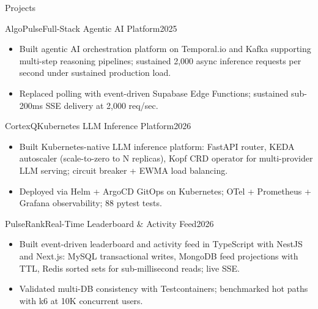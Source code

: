 \documentclass[]{mcdowellcv}
\begin{document}
\begin{cvsection}{Projects}
  \begin{cvsubsection}{AlgoPulse}{Full-Stack Agentic AI Platform}{2025}
    \begin{itemize}
      \item Built agentic AI orchestration platform on Temporal.io and Kafka supporting multi-step reasoning pipelines; sustained 2,000 async inference requests per second under sustained production load.
      \item Replaced polling with event-driven Supabase Edge Functions; sustained sub-200ms SSE delivery at 2,000 req/sec.
    \end{itemize}
    \vspace{-1.5pt}
  \end{cvsubsection}

  \begin{cvsubsection}{CortexQ}{Kubernetes LLM Inference Platform}{2026}
    \begin{itemize}
      \item Built Kubernetes-native LLM inference platform: FastAPI router, KEDA autoscaler (scale-to-zero to N replicas), Kopf CRD operator for multi-provider LLM serving; circuit breaker + EWMA load balancing.
      \item Deployed via Helm + ArgoCD GitOps on Kubernetes; OTel + Prometheus + Grafana observability; 88 pytest tests.
    \end{itemize}
    \vspace{-1.5pt}
  \end{cvsubsection}

  \begin{cvsubsection}{PulseRank}{Real-Time Leaderboard \& Activity Feed}{2026}
    \begin{itemize}
      \item Built event-driven leaderboard and activity feed in TypeScript with NestJS and Next.js: MySQL transactional writes, MongoDB feed projections with TTL, Redis sorted sets for sub-millisecond reads; live SSE.
      \item Validated multi-DB consistency with Testcontainers; benchmarked hot paths with k6 at 10K concurrent users.
    \end{itemize}
  \end{cvsubsection}
\end{cvsection}
\end{document}
